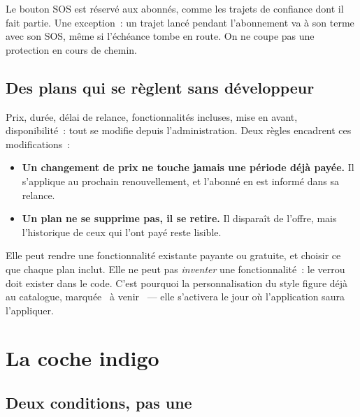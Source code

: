 \begin{note}
Le bouton SOS est réservé aux abonnés, comme les trajets de confiance dont il fait partie.
Une exception~: un trajet lancé pendant l'abonnement va à son terme avec son SOS, même si
l'échéance tombe en route. On ne coupe pas une protection en cours de chemin.
\end{note}

\section{Des plans qui se règlent sans développeur}

Prix, durée, délai de relance, fonctionnalités incluses, mise en avant, disponibilité~: tout
se modifie depuis l'administration. Deux règles encadrent ces modifications~:

\begin{itemize}[leftmargin=1.4em]
  \item \textbf{Un changement de prix ne touche jamais une période déjà payée.} Il s'applique
        au prochain renouvellement, et l'abonné en est informé dans sa relance.
  \item \textbf{Un plan ne se supprime pas, il se retire.} Il disparaît de l'offre, mais
        l'historique de ceux qui l'ont payé reste lisible.
\end{itemize}

\begin{note}
Elle peut rendre une fonctionnalité existante payante ou gratuite, et choisir ce que chaque
plan inclut. Elle ne peut pas \emph{inventer} une fonctionnalité~: le verrou doit exister
dans le code. C'est pourquoi la personnalisation du style figure déjà au catalogue, marquée
\guillemotleft~à venir~\guillemotright{} --- elle s'activera le jour où l'application saura
l'appliquer.
\end{note}

\chapter{La coche indigo}
\label{chap:abo-coche}

\section{Deux conditions, pas une}

